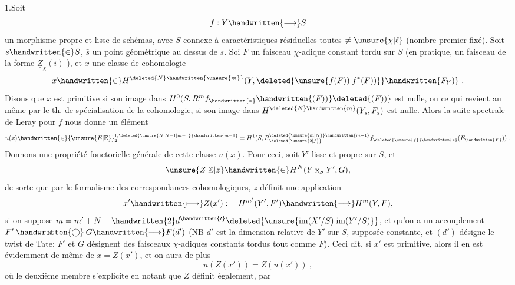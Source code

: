 
1.\quad Soit
\[
f:Y\handwritten{\longrightarrow}S
\]
un morphisme propre et lisse de schémas, avec $S$  connexe à caractéristiques résiduelles toutes $\ne\unsure{\chi|\ell}$ (nombre premier fixé). Soit $s\handwritten{\in}S$, $\bar s$ un point géométrique au dessus de $s$. Soi $F$ un faisceau $\chi$-adique constant tordu sur $S$ (en pratique, un faisceau de la forme $\underline{Z}_{\chi}(i)$ ), et $x$ une classe de cohomologie
\[
x\handwritten{\in}H^{\deleted{N}\handwritten{\unsure{m}}}(Y,\deleted{\unsure{f(F))|f^*(F))}}\handwritten{F_Y)}\ .
\]
Disons que $x$ est \uline{primitive} si son image dans $H^0(S,R^m f_{\handwritten{*}}\handwritten{(F))}\deleted{(F))}$ est nulle, ou ce qui revient au même par le th. de spécialisation de la cohomologie, si son image dans $H^{\deleted{N}\handwritten{m}}(Y_{\bar s},F_{\bar s})$ est nulle. Alors la suite spectrale de Leray pour $f$ nous donne un élément
\[
u(x)\handwritten{\in}{\unsure{E|\mathbb{E}}}_2^{1,\deleted{\unsure{N|N-1|m-1}}\handwritten{m-1}}=H^1(S,R^{\deleted{\unsure{m|N}}\handwritten{m-1}}_{\deleted{\unsure{2|f}}}f_{\deleted{\unsure{f}}\handwritten{*}}(F_{\handwritten{Y}}))\ .
\]
Donnons une propriété fonctorielle générale de cette classe $u(x)$. Pour ceci, soit $Y'$ lisse et propre sur $S$, et
\[
\unsure{Z|\mathbb{Z}|z}\handwritten{\in}H^N(Y\mathbin{\mathrm{x}}_S Y',G),
\]
de sorte que par le formalisme des correspondances cohomologiques, $z$ définit une application
\[
x'\handwritten{\longmapsto}Z(x'): \quad H^{m'}(Y',F')\handwritten{\longrightarrow}H^m(Y,F),
\]
si on suppose $m=m'+N-\handwritten{2}d^{\handwritten{\prime}}\deleted{\unsure{\mathrm{im}(X'/S)|\mathrm{im}(Y'/S)}}$, et qu'on a un accouplement $F'\mathbin{\ooalign{\hfil$\mathrm{x}$\hfil\cr\hfil$\handwritten{\bigcirc}$\hfil\cr}}G\handwritten{\longrightarrow}F(d')$ (NB $d'$ est la dimension relative de $Y'$ sur $S$, supposée constante, et $(d')$ désigne le twist de Tate; $F'$ et $G$ désignent des faisceaux $\chi$-adiques constants tordus  tout comme $F$). Ceci dit, si $x'$ est primitive, alors il en est évidemment de même de $x=Z(x')$, et on aura de plus
\[
u(Z(x'))=Z(u(x'))\ ,
\]
où le deuxième membre s'explicite en notant que $Z$ définit également, par
